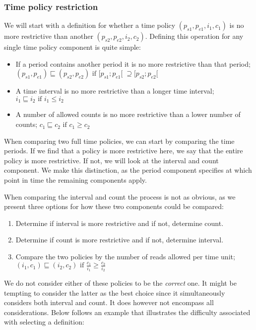 \subsubsection{Time policy restriction}\label{time:restriction}
We will start with a definition for whether a time policy $(p_{s1}, p_{e1}, i_1, c_1)$ is no more restrictive than another $(p_{s2}, p_{e2}, i_2, c_2)$.
Defining this operation for any single time policy component is quite simple:
\begin{itemize}
  \item If a period contains another period it is no more restrictive than that period; \\
  $(p_{s1}, p_{e1}) \sqsubseteq (p_{s2}, p_{e2}) \text{ if } [p_{s1}; p_{e1}[ \; \supseteq [p_{s2}; p_{e2}[$
  \item A time interval is no more restrictive than a longer time interval; \\
  $i_1 \sqsubseteq i_2 \text{ if } i_1 \leq i_2$
  \item A number of allowed counts is no more restrictive than a lower number of counts;
  $c_1 \sqsubseteq c_2 \text{ if } c_1 \geq c_2$
\end{itemize}

When comparing two full time policies, we can start by comparing the time periods.
If we find that a policy is more restrictive here, we say that the entire policy is more restrictive.
If not, we will look at the interval and count component.
We make this distinction, as the period component specifies at which point in time the remaining components apply.

When comparing the interval and count the process is not as obvious, as we present three options for how these two components could be compared:

\begin{enumerate}
  \item Determine if interval is more restrictive and if not, determine count.
  \item Determine if count is more restrictive and if not, determine interval.
  \item Compare the two policies by the number of reads allowed per time unit; \\
  $(i_1, c_1) \sqsubseteq (i_2, c_2) \text{ if } \displaystyle\frac{c_1}{i_1} \geq \frac{c_2}{i_2}$
\end{enumerate}

We do not consider either of these policies to be the \textit{correct} one.
It might be tempting to consider the latter as the best choice since it simultaneously considers both interval and count.
It does however not encompass all considerations.
Below follows an example that illustrates the difficulty associated with selecting a definition:

